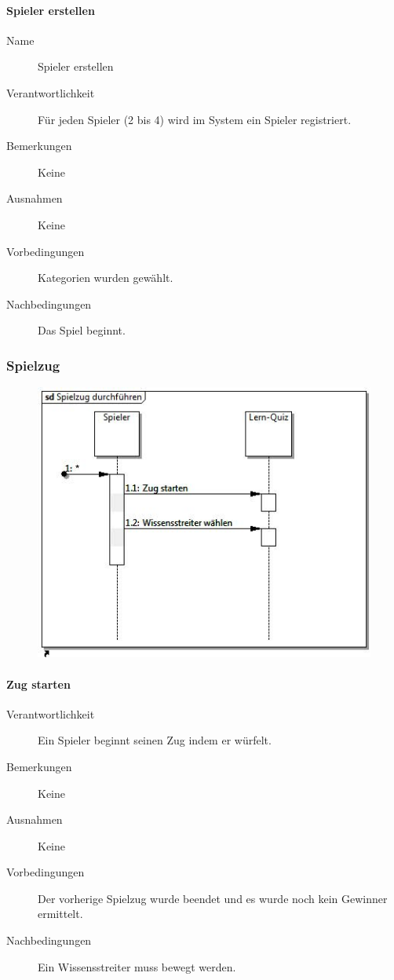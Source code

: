 \documentclass{report}
\begin{document}
\paragraph{Spieler erstellen}
\begin{description}
	\item[Name] Spieler erstellen
	\item[Verantwortlichkeit] Für jeden Spieler (2 bis 4) wird im System ein Spieler registriert.
	\item[Bemerkungen] Keine
	\item[Ausnahmen] Keine
	\item[Vorbedingungen] Kategorien wurden gewählt.
	\item[Nachbedingungen] Das Spiel beginnt.
\end{description}



\subsubsection{Spielzug}
\begin{figure}[H]
	\includegraphics[width=\textwidth]{Diagramme/SequenceDiagram-Spielzug.jpg}
	\centering
\end{figure}

\paragraph{Zug starten}
\begin{description}
	\item[Verantwortlichkeit] Ein Spieler beginnt seinen Zug indem er würfelt.
	\item[Bemerkungen] Keine
	\item[Ausnahmen] Keine
	\item[Vorbedingungen] Der vorherige Spielzug wurde beendet und es wurde noch kein Gewinner ermittelt.
	\item[Nachbedingungen] Ein Wissensstreiter muss bewegt werden.
\end{description}
\end{document}
